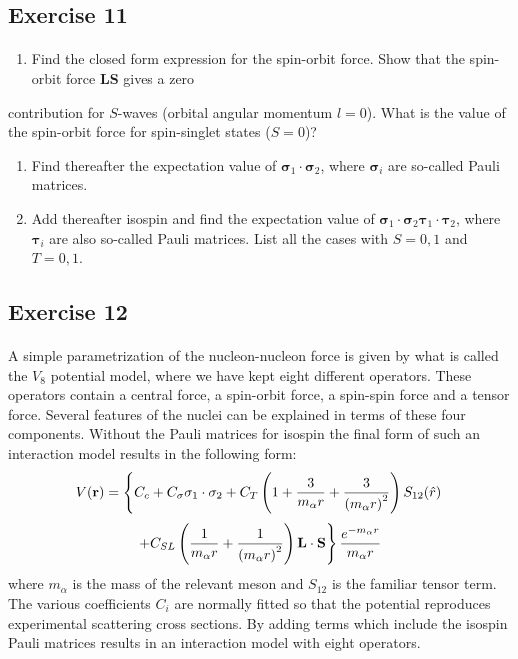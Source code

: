 \documentclass[%
twoside,                 %
final,                   %
10pt]{article}
\begin{document}
\subsection*{Exercise 11}

\paragraph{}
\begin{enumerate}
\item Find the closed form expression for the spin-orbit force. Show that the spin-orbit force {\bf LS} gives a zero
\end{enumerate}

\noindent
contribution for $S$-waves (orbital angular momentum $l=0$).   What is the value of the spin-orbit force for spin-singlet states ($S=0$)?  
\begin{enumerate}
\item Find thereafter the expectation value of $\mathbf{\sigma}_1\cdot\mathbf{\sigma}_2$, where $\mathbf{\sigma}_i$ are so-called Pauli matrices. 

\item Add thereafter isospin and find the expectation value of $\mathbf{\sigma}_1\cdot\mathbf{\sigma}_2\mathbf{\tau}_1\cdot\mathbf{\tau}_2$, where $\mathbf{\tau}_i$ are also so-called Pauli matrices. List all the cases with $S=0,1$ and $T=0,1$.
\end{enumerate}

\noindent




\subsection*{Exercise 12}

\paragraph{}
A simple parametrization of the nucleon-nucleon force is given by what is called the $V_8$ potential model,
where we have kept eight different operators. These operators contain a central force, a spin-orbit force,
a spin-spin force and a tensor force. Several features of the nuclei can be explained in terms of these four components. Without the Pauli matrices for isospin the final form of such an interaction model results in the following form: 
\[
V(\mathbf{r})= \left\{ C_c + C_\mathbf{\sigma} \mathbf{\sigma}_1\cdot\mathbf{\sigma}_2
 + C_T \left( 1 + {3\over m_\alpha r} + {3\over\left(m_\alpha r\right)^2}\right) S_{12} (\hat r)\right. 
\]
\[
\left. + C_{SL} \left( {1\over m_\alpha r} + {1\over \left( m_\alpha r\right)^2}
\right) \mathbf{L}\cdot \mathbf{S}
\right\} \frac{e^{-m_\alpha r}}{m_\alpha r}
\]
where $m_{\alpha}$ is the mass of the relevant meson and
$S_{12}$ is the familiar tensor term. The various coefficients $C_i$ are normally fitted so that the potential reproduces experimental scattering cross sections. By adding terms which include the isospin Pauli matrices 
results in an interaction model with eight operators.
\end{document}
